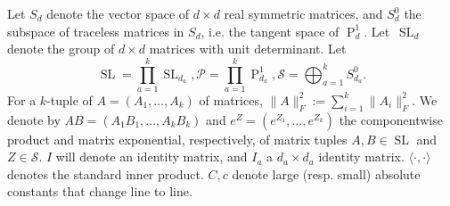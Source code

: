 \documentclass[aos]{imsart}
\theoremstyle{definition}
\newcommand{\SL}{\operatorname{SL}}
\newcommand{\PD}{\operatorname{P}}
\newcommand{\Sym}{\mathcal{S}}
\newcommand{\smallSym}{S}
\newcommand{\SPD}{\mathcal{P}}
\begin{document}
Let $\smallSym_d$ denote the vector space of $d\times d$ real symmetric matrices, and $\smallSym^0_d$ the subspace of traceless matrices in $\smallSym_d$, i.e. the tangent space of $\PD_d^1$. Let~$\SL_d$ denote the group of $d\times d$ matrices with unit determinant.
Let
$$\SL = \prod_{a=1}^k \SL_{d_a}, \SPD = \prod_{a = 1}^k \PD_{d_a}^1, \Sym = \bigoplus_{a = 1}^k \smallSym_{d_a}^0.$$ For a $k$-tuple of $A = (A_1, \dots, A_k)$ of matrices, $\|A\|_F^2:=\sum_{i = 1}^k \|A_i\|_F^2$.
 We denote by $AB=(A_1B_1,\dots,A_kB_k)$ and $e^Z=(e^{Z_1},\dots,e^{Z_k})$ the componentwise product and matrix exponential, respectively, of matrix tuples $A, B \in \SL$ and $Z\in\Sym$. $I$ will denote an identity matrix, and $I_{a}$ a $d_a\times d_a$ identity matrix. $\langle \cdot, \cdot \rangle$ denotes the standard inner product. $C, c$ denote large (resp. small) absolute constants that change line to line.
\end{document}
